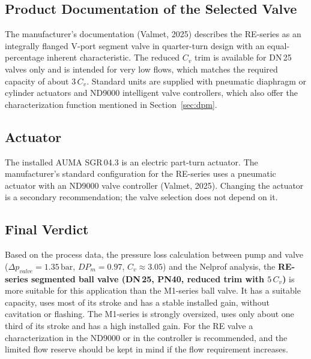 \documentclass[12pt,a4paper]{article}
\begin{document}
\subsection{Product Documentation of the Selected Valve}
The manufacturer's documentation (Valmet, 2025) describes the RE-series as an integrally flanged V-port segment valve in quarter-turn design with an equal-percentage inherent characteristic. The reduced $C_v$ trim is available for DN\,25 valves only and is intended for very low flows, which matches the required capacity of about $3\,C_v$. Standard units are supplied with pneumatic diaphragm or cylinder actuators and ND9000 intelligent valve controllers, which also offer the characterization function mentioned in Section~\ref{sec:dpm}.

\subsection{Actuator}
The installed AUMA SGR\,04.3 is an electric part-turn actuator. The manufacturer's standard configuration for the RE-series uses a pneumatic actuator with an ND9000 valve controller (Valmet, 2025). Changing the actuator is a secondary recommendation; the valve selection does not depend on it.

\subsection{Final Verdict}
Based on the process data, the pressure loss calculation between pump and valve ($\Delta p_{valve} = 1.35\,\text{bar}$, $DP_m = 0.97$, $C_v \approx 3.05$) and the Nelprof analysis, the \textbf{RE-series segmented ball valve (DN\,25, PN40, reduced trim with $5\,C_v$)} is more suitable for this application than the M1-series ball valve. It has a suitable capacity, uses most of its stroke and has a stable installed gain, without cavitation or flashing. The M1-series is strongly oversized, uses only about one third of its stroke and has a high installed gain. For the RE valve a characterization in the ND9000 or in the controller is recommended, and the limited flow reserve should be kept in mind if the flow requirement increases.

\end{document}
